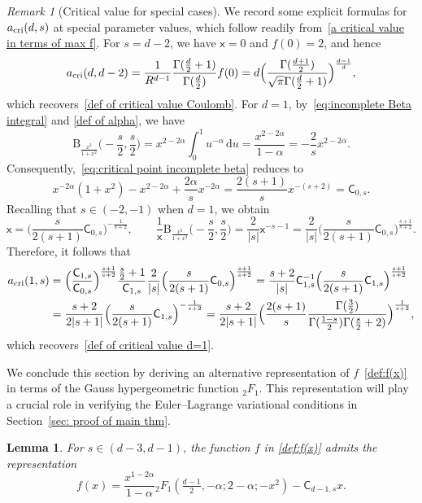 \documentclass{amsart}
\newcommand{\ud}{\, \mathrm{d}}
\theoremstyle{plain}
\newtheorem{lem}[thm]{Lemma}
\theoremstyle{remark}
\newtheorem{rem}{Remark}%
\numberwithin{equation}{section}
\begin{document}
\begin{rem}[Critical value for special cases] \label{Rem_critical special}
\label{rem:compute critical values}
We record some explicit formulas for $a_{\rm cri}(d,s)$ at special
parameter values, which follow readily from~\eqref{a critical value in terms of max f}.
For $s=d-2$, we have $\mathsf{x}=0$ and $f(0)=2$, and hence 
\[
    a_{\rm cri}(d,d-2)= \frac{1}{R^{d-1}} \frac{\Gamma(\frac{d}{2}+1)}{\Gamma(\frac{d}{2})} f(0) = d\Big(\frac{\Gamma(\frac{d+1}{2})}{\sqrt{\pi}\Gamma(\frac{d}{2}+1)}\Big)^{\frac{d-1}{d}},
\]
which recovers~\eqref{def of critical value Coulomb}. 
For $d=1$, by~\eqref{eq:incomplete Beta integral} and \eqref{def of alpha}, we have 
\[
    \mathrm{B}_{\frac{x^2}{1+x^2}}\Big(-\frac{s}{2},\frac{s}{2}\Big)= x^{2-2\alpha}\int_0^1 u^{-\alpha}\ud u =\frac{x^{2-2\alpha}}{1-\alpha} = -\frac{2}{s}x^{2-2\alpha}.
\]
Consequently,~\eqref{eq:critical point incomplete beta} reduces to 
\[
    x^{-2\alpha}(1+x^2) -x^{2-2\alpha}+\frac{2\alpha}{s}x^{-2\alpha} = \frac{2(s+1)}{s}x^{-(s+2)}= \mathsf{C}_{0,s}.
\]
Recalling that $s\in(-2,-1)$ when $d=1$, we obtain 
\[
    \mathsf{x}= \Big(\frac{s}{2(s+1)}\mathsf{C}_{0,s}\Big)^{-\frac{1}{s+2}}, \qquad \frac{1}{\mathsf{x}}\mathrm{B}_{\frac{x^2}{1+x^2}}\Big(-\frac{s}{2},\frac{s}{2}\Big)=\frac{2}{|s|}\mathsf{x}^{-s-1} = \frac{2}{|s|}\Big(\frac{s}{2(s+1)}\mathsf{C}_{0,s}\Big)^{\frac{s+1}{s+2}}.
\]
Therefore, it follows that 
\begin{align*}
    a_{\rm cri}(1,s) &=\Big(\frac{\mathsf{C}_{1,s}}{\mathsf{C}_{0,s}}\Big)^{\frac{s+1}{s+2}}
    \frac{\frac{s}{2}+1}{\mathsf{C}_{1,s}}   \frac{2}{|s|}\Big(\frac{s}{2(s+1)}\mathsf{C}_{0,s}\Big)^{\frac{s+1}{s+2}}
    = \frac{s+2}{|s|}\mathsf{C}_{1,s}^{-1} \Big(\frac{s}{2(s+1)}\mathsf{C}_{1,s}\Big)^{\frac{s+1}{s+2}}\\
    &=\frac{s+2}{2|s+1|}\Big(\frac{s}{2(s+1)}\mathsf{C}_{1,s}\Big)^{-\frac{1}{s+2}}= \frac{s+2}{2|s+1|}\Big(\frac{2(s+1)}{s}\frac{\Gamma(\frac{3}{2})}{\Gamma(\frac{1-s}{2})\Gamma(\frac{s}{2}+2)}\Big)^{\frac{1}{s+2}},
\end{align*}
which recovers~\eqref{def of critical value d=1}.
\end{rem}

We conclude this section by deriving an alternative representation of
$f$~\eqref{def:f(x)} in terms of the Gauss hypergeometric function
${}_2F_1$. This representation will play a crucial role in verifying
the Euler--Lagrange variational conditions in
Section~\ref{sec: proof of main thm}. 

\begin{lem}\label{lem:f(x) hypergeometric}
For $s\in(d-3,d-1)$, the function $f$ in \eqref{def:f(x)} admits the representation
\begin{equation}
\label{eq:f(x) hypergeometric}
    f(x)= \frac{x^{1-2\alpha}}{1-\alpha} {}_2F_1 (\tfrac{d-1}{2},-\alpha; 2-\alpha ;-x^2) - \mathsf{C}_{d-1,s}x. 
\end{equation}
\end{lem}
\end{document}
